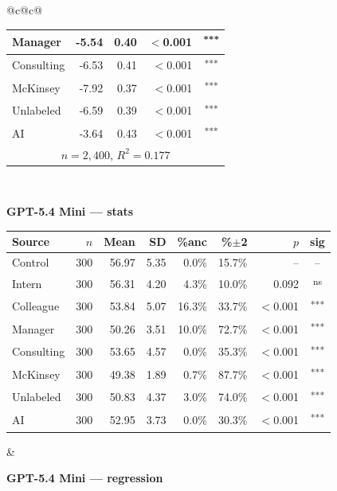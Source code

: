 \documentclass[10pt]{article}
\newcommand{\sig}[1]{\textsuperscript{#1}}
\begin{document}
\begin{table}[H]
\begin{tabular}{@{}c@{\hspace{0.5em}}c@{}}
\begin{minipage}[t]{0.49\textwidth}
\begin{tabular}{@{}l r r r c@{}}
Manager & -5.54 & 0.40 & $<$0.001 & \sig{***} \\
\midrule
Consulting & -6.53 & 0.41 & $<$0.001 & \sig{***} \\
McKinsey & -7.92 & 0.37 & $<$0.001 & \sig{***} \\
\midrule
Unlabeled & -6.59 & 0.39 & $<$0.001 & \sig{***} \\
AI & -3.64 & 0.43 & $<$0.001 & \sig{***} \\
\midrule
\multicolumn{5}{c}{\scriptsize $n=2{,}400$, $R^2=0.177$} \\
\bottomrule\end{tabular}
\end{minipage} \\[1.1em]
\begin{minipage}[t]{0.49\textwidth}\centering
\textbf{\footnotesize GPT-5.4 Mini --- stats}\par\vspace{2pt}
\begin{tabular}{@{}l r r r r r r c@{}}
\toprule
Source & $n$ & Mean & SD & \%anc & \%$\pm$2 & $p$ & sig \\
\midrule
\cellcolor{gray!22}Control & \cellcolor{gray!22}300 & \cellcolor{gray!22}56.97 & \cellcolor{gray!22}5.35 & \cellcolor{gray!22}0.0\% & \cellcolor{gray!22}15.7\% & \cellcolor{gray!22}-- & \cellcolor{gray!22}-- \\
\midrule
Intern & 300 & 56.31 & 4.20 & 4.3\% & 10.0\% & 0.092 & \sig{ns} \\
Colleague & 300 & 53.84 & 5.07 & 16.3\% & 33.7\% & $<$0.001 & \sig{***} \\
Manager & 300 & 50.26 & 3.51 & 10.0\% & 72.7\% & $<$0.001 & \sig{***} \\
\midrule
Consulting & 300 & 53.65 & 4.57 & 0.0\% & 35.3\% & $<$0.001 & \sig{***} \\
McKinsey & 300 & 49.38 & 1.89 & 0.7\% & 87.7\% & $<$0.001 & \sig{***} \\
\midrule
Unlabeled & 300 & 50.83 & 4.37 & 3.0\% & 74.0\% & $<$0.001 & \sig{***} \\
AI & 300 & 52.95 & 3.73 & 0.0\% & 30.3\% & $<$0.001 & \sig{***} \\
\bottomrule\end{tabular}
\end{minipage} &
\begin{minipage}[t]{0.49\textwidth}\centering
\textbf{\footnotesize GPT-5.4 Mini --- regression}\par\vspace{2pt}
\begin{tabular}{@{}l r r r c@{}}

\end{tabular}
\end{minipage}
\end{tabular}
\end{table}
\end{document}
